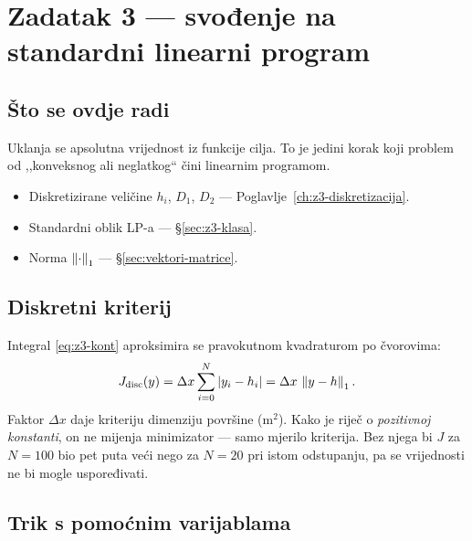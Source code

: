 \chapter{Zadatak 3 --- svođenje na standardni linearni program}
\label{ch:z3-lp}

\section{Što se ovdje radi}

Uklanja se apsolutna vrijednost iz funkcije cilja. To je jedini korak koji
problem od ,,konveksnog ali neglatkog`` čini linearnim programom.

\begin{predznanje}
\begin{itemize}[nosep,leftmargin=*]
  \item Diskretizirane veličine $h_i$, $D_1$, $D_2$ --- Poglavlje~\ref{ch:z3-diskretizacija}.
  \item Standardni oblik LP-a --- \S\ref{sec:z3-klasa}.
  \item Norma $\left\lVert \cdot \right\rVert_1$ --- \S\ref{sec:vektori-matrice}.
\end{itemize}
\end{predznanje}

\section{Diskretni kriterij}
\label{sec:z3-kriterij}

\begin{korak}
Integral \eqref{eq:z3-kont} aproksimira se pravokutnom kvadraturom po čvorovima:
\begin{equation}
J_{\mathrm{disc}}(y) = \Delta x \sum_{i=0}^{N} \left\lvert y_i - h_i \right\rvert
                     = \Delta x \, \left\lVert y - h \right\rVert_1 .
\label{eq:z3-Jdisc}
\end{equation}
Faktor $\Delta x$ daje kriteriju dimenziju površine ($\mathrm{m}^2$). Kako je
riječ o \emph{pozitivnoj konstanti}, on ne mijenja minimizator --- samo mjerilo
kriterija. Bez njega bi $J$ za $N = 100$ bio pet puta veći nego za $N = 20$ pri
istom odstupanju, pa se vrijednosti ne bi mogle uspoređivati.
\end{korak}

\section{Trik s pomoćnim varijablama}
\label{sec:z3-l1-trik}

